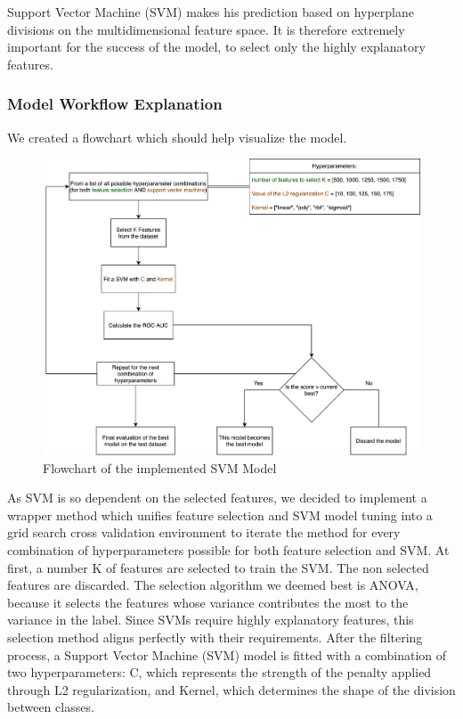 \documentclass{article}
\begin{document}
Support Vector Machine (SVM) makes his prediction based on hyperplane divisions on the multidimensional feature space. It is therefore extremely important for the success of the model, to select only the highly explanatory features. 

\subsubsection{Model Workflow Explanation}

We created a flowchart which should help visualize the model.

\begin{figure}[h]
	\centering
	\includegraphics[width=1.0\textwidth]{FlowChart.png}
	 \vspace{0em}
	\caption{Flowchart of the implemented SVM Model}
\end{figure}

As SVM is so dependent on the selected features, we decided to implement a wrapper method which unifies feature selection and SVM model tuning into a grid search cross validation environment to iterate the method for every combination of hyperparameters possible for both feature selection and SVM. At first, a number K of features are selected to train the SVM. The non selected features are discarded. The selection algorithm we deemed best is ANOVA, because it selects the features whose variance contributes the most to the variance in the label. Since SVMs require highly explanatory features, this selection method aligns perfectly with their requirements. After the filtering process, a Support Vector Machine (SVM) model is fitted with a combination of two hyperparameters: C, which represents the strength of the penalty applied through L2 regularization, and Kernel, which determines the shape of the division between classes.
\end{document}
